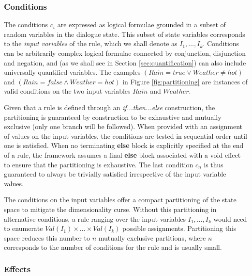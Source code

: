 \subsubsection*{Conditions}

The conditions $c_i$ are expressed as logical formulae grounded in a subset of random variables in the dialogue state. This subset of state variables corresponds to the \textit{input variables} of the rule, which we shall denote as $I_1, \dots, I_{k}$. Conditions can be arbitrarily complex logical formulae connected by conjunction, disjunction and negation, and (as we shall see in Section \ref{sec:quantification}) can also include universally quantified variables. The examples $(\mathit{Rain}\!=\mathit{true} \lor \mathit{Weather}\!\neq\mathit{hot})$ and $(\mathit{Rain}\!=\mathit{false} \land \mathit{Weather}\!=\mathit{hot})$ in Figure \ref{fig:partitioning} are instances of valid conditions on the two input variables $Rain$ and $\mathit{Weather}$. 

Given that a rule is defined through an \textit{if...then...else} construction, the partitioning is guaranteed by construction to be exhaustive and mutually exclusive (only one branch will be followed).  When provided with an assignment of values on the input variables, the conditions are tested in sequential order until one is satisfied. When no terminating \textbf{else} block is explicitly specified at the end of a rule, the framework assumes a final \textbf{else} block associated with a void effect to ensure that the partitioning is exhaustive. The last condition $c_n$ is thus guaranteed to always be trivially satisfied irrespective of the input variable values. 

The conditions on the input variables offer a compact partitioning of the state space to mitigate the dimensionality curse.  Without this partitioning in alternative conditions, a rule ranging over the input variables $I_1, \dots, I_{k}$ would need to enumerate $\mathit{Val}(I_1) \times \dots \times \mathit{Val}(I_k)$ possible assignments.  Partitioning this space reduces this number to $n$ mutually exclusive partitions, where $n$ corresponds to the number of conditions for the rule and is usually small. 


\subsubsection*{Effects}

